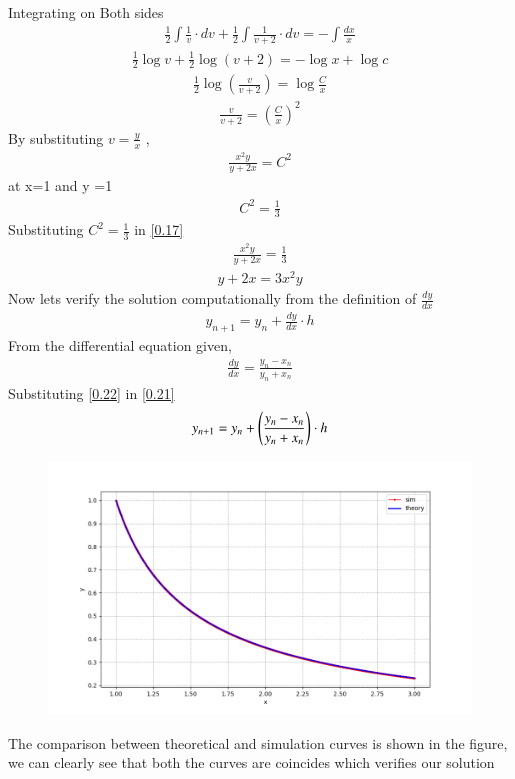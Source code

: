 \documentclass[journal]{IEEEtran}
\begin{document}
Integrating on Both sides
\begin{align}
   \frac{1}{2}\int\frac{1}{v} \cdot dv + \frac{1}{2}\int\frac{1}{v+2}\cdot dv = -\int \frac{dx}{x}
\end{align}
\begin{align}
    \frac{1}{2}\log v + \frac{1}{2}\log (v+2) = - \log{x} + \log c
\end{align}
\begin{align}
    \frac{1}{2} \log (\frac{v}{v+2}) = \log \frac{C}{x}
\end{align}
\begin{align}
    \frac{v}{v+2} = (\frac{C}{x})^2
\end{align}
By substituting $v=\frac{y}{x}$ ,
\begin{align}
    \frac{x^2 y}{y+2x} =  C^2
    \label{0.17}
\end{align}
at x=1 and y =1 
\begin{align}
    C^2 = \frac{1}{3}
\end{align}
Substituting $C^2 = \frac{1}{3}$ in \ref{0.17} 
\begin{align}
    \frac{x^2y}{y+2x} = \frac{1}{3}
\end{align}
\begin{align}
    y+2x = 3x^2y
\end{align}
Now lets verify the solution computationally from the definition of $\frac{dy}{dx}$
\begin{align}
    y_{n+1}= y_{n} + \frac{dy}{dx} \cdot h
    \label{0.21}
\end{align}
From the differential equation given,
\begin{align}
    \frac{dy}{dx} = \frac{y_n - x_n}{y_n + x_n}
    \label{0.22}
\end{align}
Substituting \ref{0.22} in \ref{0.21}
\begin{align}
    y_{n+1} = y_n + \left(\frac{y_n - x_n}{y_n + x_n}\right) \cdot h 
\end{align}
\begin{figure}
    \centering
    \includegraphics[width=\columnwidth]{figs/Figure_1.png}
\end{figure}
The comparison between theoretical and simulation curves is shown in the figure, we can clearly see that both the curves are coincides which verifies our solution
\end{document}

